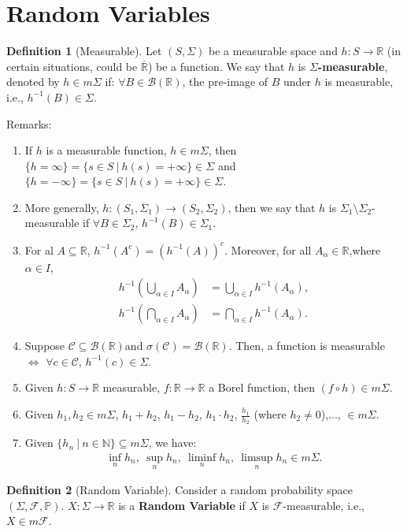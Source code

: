 \documentclass[11pt]{article}
\theoremstyle{definition}
\newtheorem{defn}{Definition}[section]
\theoremstyle{theorem}
\newcommand{\R}[0]{\mathbb{R}}
\newcommand{\N}[0]{\mathbb{N}}
\begin{document}
\section{Random Variables}
\begin{defn}[Measurable]
		Let \( (S, \Sigma) \) be a measurable space and \( h: S \rightarrow \R \) (in certain situations, could be \( \overline{\R} \)) be a function. We say that \( h \) is \( \Sigma \)\textbf{-measurable}, denoted by \( h \in m \Sigma \) if: \( \forall B \in \mathcal{B}(\R) \), the pre-image of \( B \) under \( h \) is measurable, i.e., \( h^{-1}(B) \in \Sigma \). 
\end{defn}
Remarks: 
\begin{enumerate}[noitemsep]
	\item If \( h \) is a measurable function, \( h \in m \Sigma \), then \( \{ h = \infty \} = \{ s \in S\ |\ h(s) = + \infty \} \in \Sigma \) and \( \{ h = - \infty \} = \{ s \in S\ |\ h(s) = + \infty \} \in \Sigma \). 
	\item More generally, \( h: (S_1, \Sigma_1 ) \rightarrow (S_2, \Sigma_2 ) \), then we say that \( h \) is \( \Sigma_1 \setminus \Sigma_2 \)-measurable if \( \forall B \in \Sigma_2 \), \( h^{-1}(B) \in \Sigma_1 \).  
	\item For al \( A \subseteq  \R \), \( h^{-1}(A^c ) = (h^{-1}(A))^c \). Moreover, for all \( A_\alpha \in \R \),where \( \alpha \in I \), 
	\begin{align*}
		h^{-1} \left( \bigcup_{\alpha \in I} A_\alpha \right) &  = \bigcup_{\alpha \in I} 	h^{-1}(A_\alpha), \\
		h^{-1} \left( \bigcap_{\alpha \in I} A_\alpha \right) & = \bigcap_{\alpha \in I} h^{-1}(A_\alpha).
	\end{align*}
	\item Suppose \( \mathcal{C} \subseteq \mathcal{B}(\R) \)and \( \sigma ( \mathcal{C} ) = \mathcal{B}(\R ) \). Then, a function is measurable \( \iff \) \( \forall c \in \mathcal{C} \), \( h^{-1}(c)\in \Sigma \).
	\item Given \( h: S \rightarrow \R \) measurable, \( f: \R \rightarrow \R \) a Borel function, then \( (f \circ h ) \in m \Sigma \). 
	\item Given \( h_1, h_2 \in m\Sigma \), \( h_1 + h_2\), \( h_1 - h_2 \), \( h_1 \cdot h_2 \), \( \frac{h_1}{h_2} \) (where \( h_2 \neq 0 \)),..., \( \in m\Sigma \). 
	\item Given \( \{ h_n\ |\ n \in \N \} \subseteq m \Sigma \), we have:
	\begin{align*}
		\inf_n h_n,\ \sup_n h_n,\ \liminf_n h_n,\ \limsup_n h_n \in m \Sigma. 	
	\end{align*}
\end{enumerate}
\begin{defn}[Random Variable]
	Consider a random probability space \( (\Sigma, \mathcal{F},\mathbb{P}) \). \( X: \Sigma \rightarrow \R \) is a \textbf{Random Variable} if \( X \) is \( \mathcal{F} \)-measurable, i.e., \( X \in m \mathcal{F} \). 
\end{defn}
\end{document}
